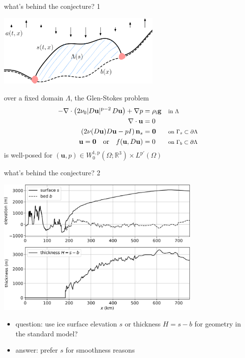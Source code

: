 \documentclass[10pt,svgnames]{beamer}
\newcommand{\bg}{\mathbf{g}}
\newcommand{\bn}{\mathbf{n}}
\newcommand{\bu}{\mathbf{u}}
\newcommand{\bzero}{\bm{0}}
\newcommand{\RR}{\mathbb{R}}
\newcommand{\pp}{\mathrm{p}}
\newcommand{\rhoi}{\rho_{\text{i}}}
\newcommand{\where}[1]{\text{\footnotesize #1}}
\begin{document}
\begin{frame}{what's behind the conjecture? 1}

\begin{center}
\includegraphics[width=0.6\textwidth]{stokesdomain}
\end{center}

\begin{theorem}
over a fixed domain $\Lambda$, the Glen-Stokes problem
\begin{align*}
- \nabla \cdot \left(2 \nu_0 |D\bu|^{\pp-2}\, D\bu\right) + \nabla p &= \rhoi \bg && \where{in $\Lambda$} \\
\nabla \cdot \bu &= 0 \\
\left(2 \nu(D\bu) D\bu - pI\right) \bn_s &= \bzero && \where{on $\Gamma_s \subset \partial\Lambda$} \\
\bu  = \bzero \quad \text{or} \quad f(\bu,D\bu) &= 0 && \where{on $\Gamma_b \subset \partial\Lambda$}
\end{align*}
is well-posed for $(\bu,p) \in W^{1,\pp}_0(\Omega;\RR^3) \times L^{\pp'}(\Omega)$
\end{theorem}
\end{frame}


\begin{frame}{what's behind the conjecture? 2}

\bigskip
\begin{center}
\includegraphics[width=0.75\textwidth]{giscross}
\end{center}

\begin{itemize}
\item question: use ice surface elevation $s$ or thickness $H = s - b$ for geometry in the standard model?
\item answer: prefer $s$ for smoothness reasons
\end{itemize}
\end{frame}
\end{document}
